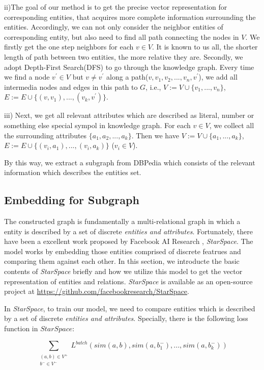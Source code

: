 ii)The goal of our method is to get the precise vector representation for corresponding entities,
that acquires more complete information surrounding the entities.
Accordingly, we can not only consider the neighbor entities of corresponding entity, but also
need to find all path connecting the nodes in $V$. 
We firstly get the one step neighbors for each $v \in V$. It is known to us all, the shorter
length of path between two entities, the more relative they are.
Secondly, we adopt Depth-First Search(DFS) to go through the knowledge graph. Every time we find a node
$v^{'} \in V$ but $v \ne v^{'}$ along a path($v, v_1, v_2,...,v_n, v^{'}$), we add all intermedia 
nodes and edges in this path to $G$, i.e., $V:=V \cup \{v_1, ..., v_n\}$, 
$E:=E \cup \{(v, v_1), ..., (v_k, v^{'})\}$.

iii) Next, we get all relevant attributes which are described as literal, number or something 
else special sympol in knowledge graph. For each $v \in V$, we collect all the surrounding attributes 
$\{a_1, a_2, ..., a_k\}$. Then we have $V:=V \cup \{a_1, ..., a_k\}$, 
$E:=E \cup \{(v_i, a_1), ..., (v_i, a_k)\}$ ($v_i \in V$).

By this way, we extract a subgraph from DBPedia which consists of the relevant information which describes
the entities set.

\subsection{Embedding for Subgraph}
The constructed graph is fundamentally a multi-relational graph in which a entity is described by a set of discrete
\emph{entities and attributes}. Fortunately, there have been a excellent work proposed by Facebook AI Research
, \emph{StarSpace}. The model works by embedding those entities comprised of discrete featrues and
comparing them against each other. In this section, we introducte the basic contents of \emph{StarSpace} briefly and
how we utilize this model to get the vector representation of entities and relations. \emph{StarSpace} is available as
an open-source project at \url{https://github.com/facebookresearch/StarSpace}.

In \emph{StarSpace}, to train our model, we need to compare entities which is described by a set of discrete
\emph{entities and attributes}. Specially, there is the following loss function in $StarSpace$:

\begin{small}
    \begin{equation}
        \nonumber
        \label{starspace_formula}
        \sum_{\substack{(a,b) \in V^+\\ b^- \in V^-}}L^{batch}(sim(a,b),sim(a,b_1^-),...,sim(a,b_k^-))
    \end{equation}
\end{small}

